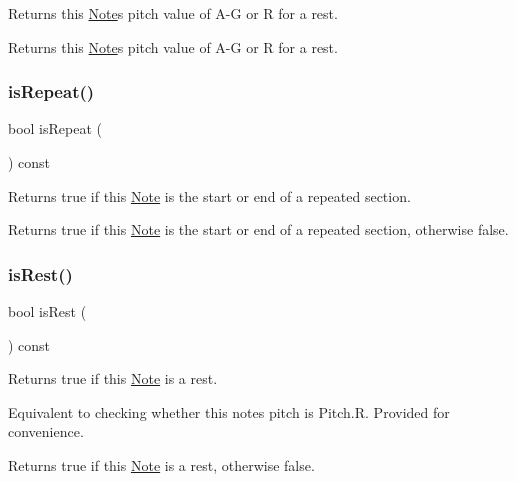 Returns this \mbox{\hyperlink{classNote}{Note}}\textquotesingle{}s pitch value of A-\/G or R for a rest. 

\begin{DoxyReturn}{Returns}
this \mbox{\hyperlink{classNote}{Note}}\textquotesingle{}s pitch value of A-\/G or R for a rest. 
\end{DoxyReturn}
\mbox{\label{classNote_a2b1f400ca39661825e037dc1e671cbd5}} 
\subsubsection{\texorpdfstring{is\+Repeat()}{isRepeat()}}
{\footnotesize\ttfamily bool is\+Repeat (\begin{DoxyParamCaption}{ }\end{DoxyParamCaption}) const}



Returns true if this \mbox{\hyperlink{classNote}{Note}} is the start or end of a repeated section. 

\begin{DoxyReturn}{Returns}
true if this \mbox{\hyperlink{classNote}{Note}} is the start or end of a repeated section, otherwise false. 
\end{DoxyReturn}
\mbox{\label{classNote_a64189c4cbf65dcc5c4464289e7ec59a6}} 
\subsubsection{\texorpdfstring{is\+Rest()}{isRest()}}
{\footnotesize\ttfamily bool is\+Rest (\begin{DoxyParamCaption}{ }\end{DoxyParamCaption}) const}



Returns true if this \mbox{\hyperlink{classNote}{Note}} is a rest. 

Equivalent to checking whether this note\textquotesingle{}s pitch is Pitch.\+R. Provided for convenience. \begin{DoxyReturn}{Returns}
true if this \mbox{\hyperlink{classNote}{Note}} is a rest, otherwise false. 
\end{DoxyReturn}
\mbox{\label{classNote_af351bf66fe7175bc6de020b7083f3fb3}} 
